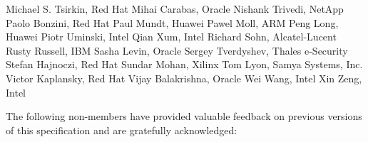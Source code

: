Michael S. Tsirkin,	Red Hat	\newline
Mihai Carabas,	Oracle	\newline
Nishank Trivedi, NetApp	\newline
Paolo Bonzini,	Red Hat	\newline
Paul Mundt, Huawei	\newline
Pawel Moll,	ARM	\newline
Peng Long,	Huawei	\newline
Piotr Uminski, Intel	\newline
Qian Xum, Intel	\newline
Richard Sohn,	Alcatel-Lucent	\newline
Rusty Russell,	IBM	\newline
Sasha Levin,	Oracle	\newline
Sergey Tverdyshev,	Thales e-Security	\newline
Stefan Hajnoczi,	Red Hat	\newline
Sundar Mohan, Xilinx	\newline
Tom Lyon,	Samya Systems, Inc.	\newline
Victor Kaplansky, Red Hat	\newline
Vijay Balakrishna,	Oracle	\newline
Wei Wang, Intel	\newline
Xin Zeng, Intel	\newline

The following non-members have provided valuable feedback on
previous versions of this
specification and are gratefully acknowledged:


